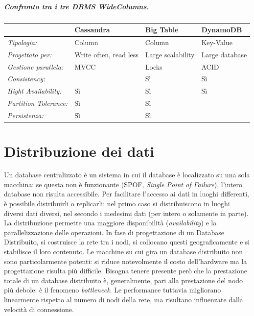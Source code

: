 \documentclass[a4page, 11pt]{article}
\begin{document}
\subsubsection*{Confronto tra i tre DBMS WideColumns.}
\begin{center}
  \begin{tabular}{l|l|l|l}
    & \textbf{Cassandra} & \textbf{Big Table} & \textbf{DynamoDB} \\
    \hline
    \textit{Tipologia:} & Column & Column & Key-Value \\
    \textit{Progettato per:} & Write often, read less & Large scalability & Large database \\
    \textit{Gestione parallela:} & MVCC & Locks & ACID \\
    \textit{Consistency:} & & Sì & Sì \\
    \textit{Hight Availability:} & Sì & Sì & Sì \\
    \textit{Partition Tolerance:} & Sì & Sì & \\
    \textit{Persistenza:} & Sì & Sì & \\
  \end{tabular}
\end{center}


\part{Distribuzione dei dati}
Un database centralizzato è un sistema in cui il database è localizzato su una sola macchina: se questa non è funzionante (SPOF, \textit{Single Point of Failure}), l'intero database non risulta accessibile.
Per facilitare l'accesso ai dati in luoghi differenti, è possibile distribuirli o replicarli: nel primo caso si distribuiscono in luoghi diversi dati diversi, nel secondo i medesimi dati (per intero o solamente in parte).
La distribuzione permette una maggiore disponibilità (\textit{availability}) e la parallelizzazione delle operazioni.
In fase di progettazione di un Database Distribuito, si costruisce la rete tra i nodi, si collocano questi geograficamente e si stabilisce il loro contenuto.
Le macchine su cui gira un database distribuito non sono particolarmente potenti: si riduce notevolmente il costo dell'hardware ma la progettazione risulta più difficile.
Bisogna tenere presente però che la prestazione totale di un database distribuito è, generalmente, pari alla prestazione del nodo più debole: è il fenomeno \textit{bottleneck}.
Le performance tuttavia migliorano linearmente rispetto al numero di nodi della rete, ma risultano influenzate dalla velocità di connessione.
\end{document}
